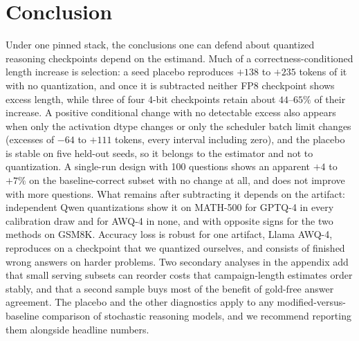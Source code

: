\documentclass[11pt,a4paper]{article}
\begin{document}
\section{Conclusion}
\label{sec:conclusion}
Under one pinned stack, the conclusions one can defend about quantized reasoning checkpoints depend on the estimand. Much of a correctness-conditioned length increase is selection: a seed placebo reproduces $+138$ to $+235$ tokens of it with no quantization, and once it is subtracted neither FP8 checkpoint shows excess length, while three of four 4-bit checkpoints retain about $44$--$65\%$ of their increase. A positive conditional change with no detectable excess also appears when only the activation dtype changes or only the scheduler batch limit changes (excesses of $-64$ to $+111$ tokens, every interval including zero), and the placebo is stable on five held-out seeds, so it belongs to the estimator and not to quantization. A single-run design with 100 questions shows an apparent $+4$ to $+7\%$ on the baseline-correct subset with no change at all, and does not improve with more questions. What remains after subtracting it depends on the artifact: independent Qwen quantizations show it on MATH-500 for GPTQ-4 in every calibration draw and for AWQ-4 in none, and with opposite signs for the two methods on GSM8K. Accuracy loss is robust for one artifact, Llama AWQ-4, reproduces on a checkpoint that we quantized ourselves, and consists of finished wrong answers on harder problems. Two secondary analyses in the appendix add that small serving subsets can reorder costs that campaign-length estimates order stably, and that a second sample buys most of the benefit of gold-free answer agreement. The placebo and the other diagnostics apply to any modified-versus-baseline comparison of stochastic reasoning models, and we recommend reporting them alongside headline numbers.
\end{document}
